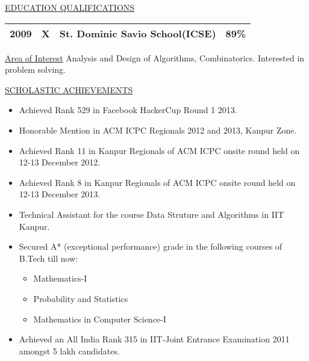 \documentclass[10pt]{res}
\begin{document}
\begin{resume}
\begin{section}{\underline{EDUCATION QUALIFICATIONS}}
\begin{tabular}{|l|l|l|l|}
    \hline
    \hspace{9mm}2009\hspace{9mm} &  \hspace{8mm}X\hspace{8mm} & \hspace{9mm}St. Dominic Savio School(ICSE)\hspace{9mm} & \hspace{9mm}89\%\hspace{9mm}\\ [1ex]
    \hline
    \end{tabular}
\end{section}

\begin{section}{\underline{Area of Interest}}
Analysis and Design of Algorithms, Combinatorics.\newline
Interested in problem solving.\newline
\end{section}

\begin{section}{\underline{SCHOLASTIC ACHIEVEMENTS}}
\vspace{.2in}
\begin{itemize}
\item{
Achieved Rank 529 in Facebook HackerCup Round 1 2013.
}
\item{
Honorable Mention in ACM ICPC Regionals 2012 and 2013, Kanpur Zone.
}
\item{
Achieved Rank 11 in Kanpur Regionals of ACM ICPC onsite round held on 12-13 December 2012.
}
\item{
Achieved Rank 8 in Kanpur Regionals of ACM ICPC onsite round held on 12-13 December 2013.
}
\item{
Technical Assistant for the course Data Struture and Algorithms in IIT Kanpur.
}
\item{
Secured A* (exceptional performance) grade in the following courses of B.Tech till now:
\begin{itemize}
\item{
Mathematics-I
}
\item{
Probability and Statistics
}
\item{
Mathematics in Computer Science-I
}
\end{itemize}
}
\item{Achieved an All India Rank 315 in IIT-Joint Entrance Examination 2011 amongst 5 lakh candidates.
}
\end{itemize}
\end{section}




\end{resume}
\end{document}
